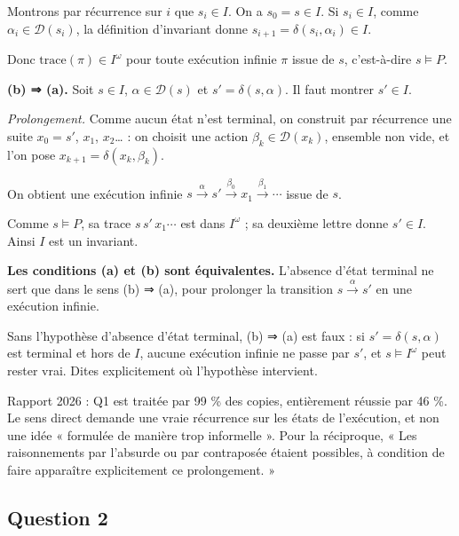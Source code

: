 \documentclass[11pt,a4paper]{article}
\begin{document}
Montrons par récurrence sur \(i\) que \(s_i\in I\). On a \(s_0=s\in I\). Si \(s_i\in I\), comme \(\alpha_i\in\mathcal D(s_i)\), la définition d'invariant donne \(s_{i+1}=\delta(s_i,\alpha_i)\in I\).

Donc \(\mathrm{trace}(\pi)\in I^\omega\) pour toute exécution infinie \(\pi\) issue de \(s\), c'est-à-dire \(s\models P\).

\textbf{(b) ⇒ (a).} Soit \(s\in I\), \(\alpha\in\mathcal D(s)\) et \(s'=\delta(s,\alpha)\). Il faut montrer \(s'\in I\).

\emph{Prolongement.} Comme aucun état n'est terminal, on construit par récurrence une suite \(x_0=s'\), \(x_1\), \(x_2\)\ldots{} : on choisit une action \(\beta_k\in\mathcal D(x_k)\), ensemble non vide, et l'on pose \(x_{k+1}=\delta(x_k,\beta_k)\).

On obtient une exécution infinie \(s\xrightarrow{\alpha}s'\xrightarrow{\beta_0}x_1\xrightarrow{\beta_1}\cdots\) issue de \(s\).

Comme \(s\models P\), sa trace \(s\,s'\,x_1\cdots\) est dans \(I^\omega\) ; sa deuxième lettre donne \(s'\in I\). Ainsi \(I\) est un invariant.

\textbf{Les conditions (a) et (b) sont équivalentes.} L'absence d'état terminal ne sert que dans le sens (b) ⇒ (a), pour prolonger la transition \(s\xrightarrow{\alpha}s'\) en une exécution infinie.

\begin{piege}

Sans l'hypothèse d'absence d'état terminal, (b) ⇒ (a) est faux : si \(s'=\delta(s,\alpha)\) est terminal et hors de \(I\), aucune exécution infinie ne passe par \(s'\), et \(s\models I^\omega\) peut rester vrai. Dites explicitement où l'hypothèse intervient.

\end{piege}

\begin{jury}

Rapport 2026 : Q1 est traitée par 99 \% des copies, entièrement réussie par 46 \%. Le sens direct demande une vraie récurrence sur les états de l'exécution, et non une idée « formulée de manière trop informelle ». Pour la réciproque, « Les raisonnements par l'absurde ou par contraposée étaient possibles, à condition de faire apparaître explicitement ce prolongement. »

\end{jury}

\hypertarget{question-2}{%
\subsection{Question 2}\label{question-2}}
\end{document}
